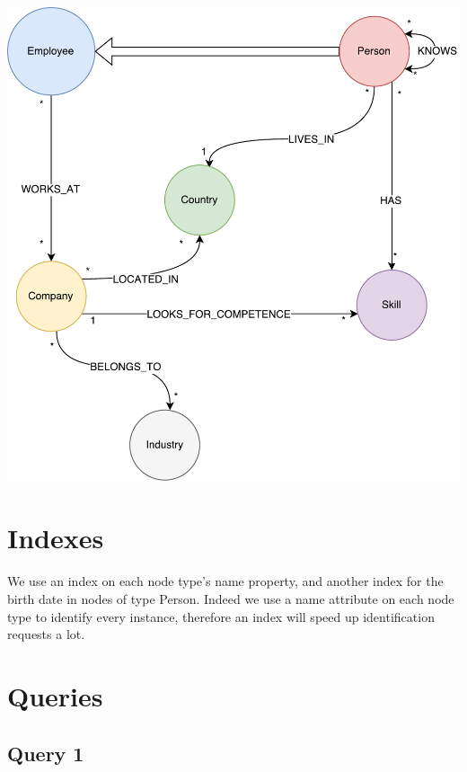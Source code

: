 \documentclass[a4paper, 11pt, titlepage]{article}
\begin{document}
\begin{center}
\includegraphics[scale=0.6]{res/database.pdf}
\end{center}


\section {Indexes}


We use an index on each node type's name property, and another index for the birth date in nodes of type Person. Indeed we use a name attribute on each node type to identify every instance, therefore an index will speed up identification requests a lot.


\section {Queries}

\subsection {Query 1}
\end{document}
